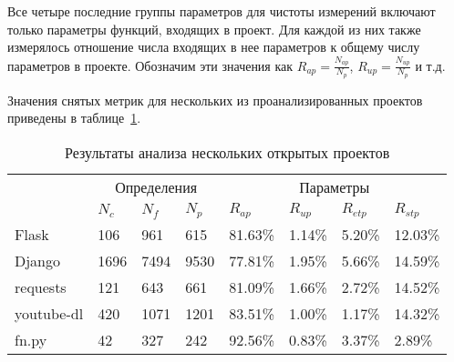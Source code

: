 Все четыре последние группы параметров для чистоты измерений включают только параметры функций,
входящих в проект. Для каждой из них также измерялось отношение числа входящих в
нее параметров к общему числу параметров в проекте. Обозначим эти значения как $R_{ap} =
\frac{N_{ap}}{N_p}$, $R_{up} = \frac{N_{up}}{N_p}$ и т.д.

Значения снятых метрик для нескольких из проанализированных проектов приведены в
таблице~\ref{tab:statistic-results-1}.

\begin{table}[H]
  \small
  \caption{Результаты анализа нескольких открытых проектов}
  \label{tab:statistic-results-1}
  \begin{tabularx}{\textwidth}{ |X|X|X|X|X|X|X|X| }
    \hline
    \multicolumn{1}{|c|}{\multirow{2}{*}{}} &
    \multicolumn{3}{c|}{Определения} &
    \multicolumn{4}{c|}{Параметры}
    \\ \cline{2-8}
    & $N_c$ & $N_f$ & $N_p$ & $R_{ap}$ & $R_{up}$ & $R_{etp}$ & $R_{stp}$ 
    \\ \hline

    Flask & 106 & 961 & 615 & 81.63\% & 1.14\% & 5.20\% & 12.03\%
    \\ \hline

    Django & 1696 & 7494 & 9530 & 77.81\% & 1.95\% & 5.66\% & 14.59\%
    \\ \hline

    requests & 121 & 643 & 661 & 81.09\% & 1.66\% & 2.72\% & 14.52\%
    \\ \hline

    youtube-dl & 420 & 1071 & 1201 & 83.51\% & 1.00\% & 1.17\% & 14.32\%
    \\ \hline

    fn.py & 42 & 327 & 242 & 92.56\% & 0.83\% & 3.37\% & 2.89\%
    \\ \hline






  \end{tabularx}
\end{table}

